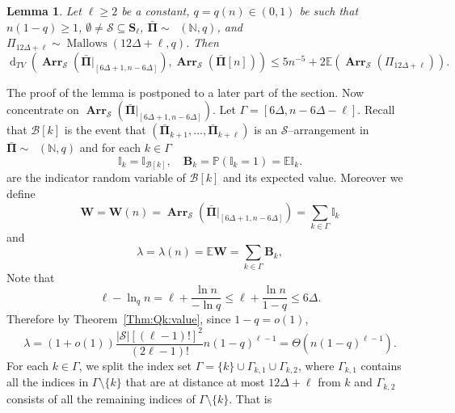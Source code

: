 \documentclass[letterpaper,11pt]{article}
\newtheorem{lemma}[theorem]{Lemma}
\theoremstyle{definition}
\theoremstyle{remark}
\renewcommand{\le}{\leqslant}
\renewcommand{\ge}{\geqslant}
\DeclareMathOperator{\Mallow}{Mallows}
\DeclareMathOperator{\Mallows}{Mallows_{seq}}
\newcommand{\bE}{\mathbb{E}}
\newcommand{\bS}{\mathbf{S}}
\newcommand{\Arr}{\ensuremath{\operatorname{\mathbf{Arr}}}}
\newcommand{\Pra}[1]{\mathbb{P}\left(#1\right)}
\newcommand{\bB}{\mathbf{B}}
\newcommand{\cB}{\mathcal{B}}
\newcommand{\Ind}{\mathbb{I}}
\newcommand{\barPi}{\bar {\mathbf \Pi}}
\newcommand{\NN}{\mathbb{N}}
\newcommand{\cS}{\mathcal{S}}
\newcommand{\dtv}{\operatorname{d}_{TV}}
\newcommand{\bW}{\mathbf{W}}
\begin{document}
\begin{lemma}\label{Lem:InclusionDTV}
	Let $\ell\ge 2$ be a constant, $q=q(n)\in (0,1)$ be such that $n(1-q)\ge 1$, $\emptyset\neq\cS\subseteq \bS_\ell$,  $\barPi\sim \Mallows(\NN,q)$, and $\varPi_{12\Delta+\ell}\sim \Mallow(12\Delta+\ell,q)$. Then 
	\[
	\dtv\left(\Arr_{\cS}(\barPi|_{[6\Delta+1,n-6\Delta]}),\Arr_{\cS}(\barPi[n])\right)
	\le 5n^{-5}+2\bE(\Arr_{\cS}(\varPi_{12\Delta+\ell})).
	\]
\end{lemma}
The proof of the lemma is postponed to a later part of the section.
Now concentrate on
$\Arr_{\cS}(\barPi|_{[6\Delta+1,n-6\Delta]})$. 
Let $\Gamma=[6\Delta,n-6\Delta-\ell]$. Recall that $\cB[k]$ is the event that $(\barPi_{k+1},\ldots,\barPi_{k+\ell})$ is an $\cS$--arrangement in $\barPi\sim\Mallows(\NN,q)$ and for each $k\in \Gamma$
\begin{equation}\label{Eq:Def:Indk}
	\Ind_k=\Ind_{\cB[k]},\quad \bB_k=\Pra{\Ind_k=1}=\bE \Ind_k. 
\end{equation}
are the indicator random variable of $\cB[k]$ and its expected value.  Moreover we define
\[\bW=\bW(n)=\Arr_\cS(\barPi|_{[6\Delta+1,n-6\Delta]})=\sum_{k\in\Gamma}\Ind_k\]
and
\[\lambda = \lambda(n) = \bE \bW = \sum_{k\in \Gamma} \bB_{k},\]
Note that
\begin{equation}\label{Eq:ell:Delta}
	\ell - \ln_q n = \ell + \frac{\ln n}{-\ln q} \le \ell + \frac{\ln n}{1-q} \le 6\Delta.
\end{equation}
Therefore by Theorem~\ref{Thm:Qk:value}, since $1-q=o(1)$,
\begin{equation}\label{Eq:Lambda}
	\lambda=(1+o(1))\frac{|\cS|[(\ell-1)!]^2}{(2\ell-1)!}n(1-q)^{\ell-1}=\Theta(n(1-q)^{\ell-1}).
\end{equation}
For each $k\in \Gamma$, we split the index set $\Gamma=\{k\}\cup\Gamma_{k,1}\cup\Gamma_{k,2}$, where $\Gamma_{k,1}$ contains all the indices in $\Gamma\setminus\{k\}$ that are at distance at most $12\Delta+\ell$ from $k$ and $\Gamma_{k,2}$ consists of all the remaining indices of $\Gamma\setminus\{k\}$. That is
\end{document}
